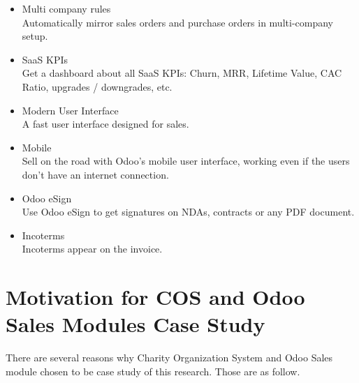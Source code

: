 \begin{itemize}
	\item Multi company rules \\
	Automatically mirror sales orders and purchase orders in multi-company setup.
	
	\item SaaS KPIs \\
	Get a dashboard about all SaaS KPIs: Churn, MRR, Lifetime Value, CAC Ratio, upgrades / downgrades, etc.
	
	\item Modern User Interface \\
	A fast user interface designed for sales. 
	
	\item Mobile \\
	Sell on the road with Odoo's mobile user interface, working even if the users don't have an internet connection.
	
	\item Odoo eSign \\
	Use Odoo eSign to get signatures on NDAs, contracts or any PDF document.
	
	\item Incoterms \\
	Incoterms appear on the invoice.
\end{itemize}

\section{Motivation for COS and Odoo Sales Modules Case Study}\label{MotivationCaseStudy}
There are several reasons why Charity Organization System and Odoo Sales module chosen to be case study of this research. Those are as follow.

